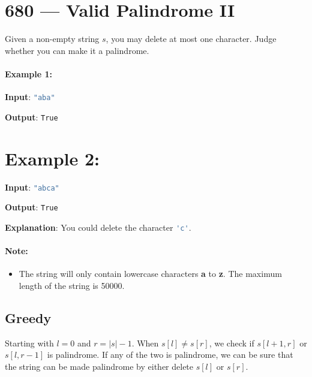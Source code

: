 \section{680 --- Valid Palindrome II}
Given a non-empty string $s$, you may delete at most one character. Judge whether you can make it a palindrome.

\paragraph{Example 1:}

\begin{flushleft}
\textbf{Input}: \lstinline[language=Java, basicstyle=\small\ttfamily, keywordstyle=\bfseries\color{green!40!black}]|"aba"|

\textbf{Output}: \lstinline[language=Java, basicstyle=\small\ttfamily, keywordstyle=\bfseries\color{green!40!black}]|True|

\end{flushleft}

\section{Example 2:}

\begin{flushleft}
\textbf{Input}: \lstinline[language=Java, basicstyle=\small\ttfamily, keywordstyle=\bfseries\color{green!40!black}]|"abca"|

\textbf{Output}: \lstinline[language=Java, basicstyle=\small\ttfamily, keywordstyle=\bfseries\color{green!40!black}]|True|

\textbf{Explanation}: You could delete the character \lstinline[language=Java, basicstyle=\small\ttfamily, keywordstyle=\bfseries\color{green!40!black}]|'c'|.

\end{flushleft}

\paragraph{Note:}

\begin{itemize}
\item  The string will only contain lowercase characters \textbf{a} to \textbf{z}. The maximum length of the string is 50000.
\end{itemize}

\subsection{Greedy}
Starting with $l=0$ and $r = \left|s\right|-1$. When $s[l]\neq s[r]$, we check if $s[l+1, r]$ or $s[l, r-1]$ is palindrome. If any of the two is palindrome, we can be sure that the string can be made palindrome by either delete $s[l]$ or $s[r]$. 

